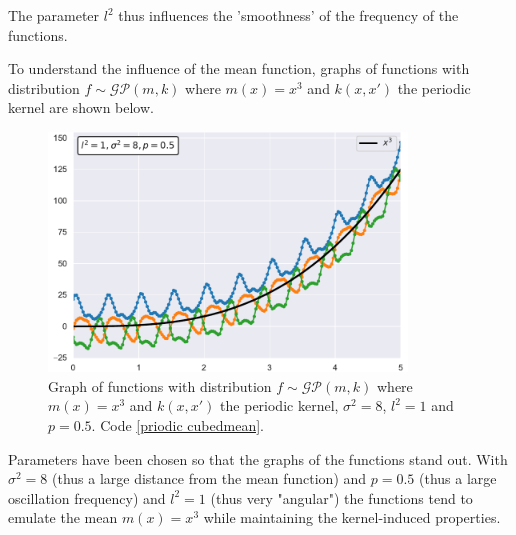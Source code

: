 The parameter $l^2$ thus influences the 'smoothness' of the frequency of the functions.


\newpage 
To understand the influence of the mean function, graphs of functions with distribution $f\sim \mathcal{GP}(m,k)$ where $m(x)=x^3$ and $k(x,x')$ the periodic kernel are shown below.
\begin{figure}[h]
    \centering
    \includegraphics[width=0.85\textwidth]{images/Gaussian process/Periodic - cubedmean.pdf}
    \caption{Graph of functions with distribution  $f\sim \mathcal{GP}(m,k)$ where $m(x)=x^3$ and $k(x,x')$ the periodic kernel, $\sigma^2=8$, $l^2=1$ and $p=0.5$. Code \ref{priodic cubedmean}.}
    \label{3 sample periodic kernel cubed mean}
\end{figure}

Parameters have been chosen so that the graphs of the functions stand out. With $\sigma^2=8$ (thus a large distance from the mean function) and $p=0.5$ (thus a large oscillation frequency) and $l^2=1$ (thus very "angular") the functions tend to emulate the mean $m(x)=x^3$ while maintaining the kernel-induced properties.

\newpage



